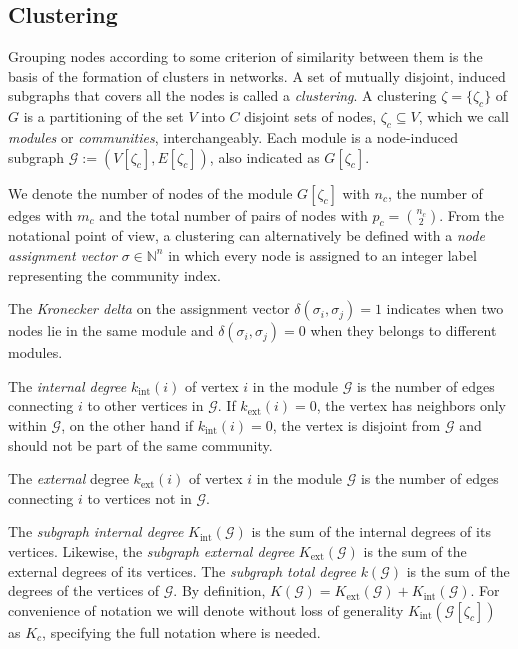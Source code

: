 \subsection{Clustering}\label{sec:clustering}
Grouping nodes according to some criterion of similarity between them is the basis of the formation of clusters in networks.
A set of mutually disjoint, induced subgraphs that covers all the nodes is called a \emph{clustering}.
A clustering $\zeta = \{\zeta_c\}$ of $G$ is a partitioning of the set $V$ into $C$ disjoint sets of nodes, $\zeta_c \subseteq V$, which we call \emph{modules} or \emph{communities}, interchangeably. 
Each module is a node-induced subgraph $\mathcal{G}:=(V[\zeta_c],E[\zeta_c])$, also indicated as $G[\zeta_c]$.

We denote the number of nodes of the module $G[\zeta_c]$ with $n_c$, the number of edges with $m_c$ and the total number of pairs of nodes with $p_c=\binom{n_c}{2}$.
From the notational point of view, a clustering can alternatively be defined with a \emph{node assignment vector} $\sigma \in \mathbb{N}^n$ in which every node is assigned to an integer label representing the community index. 

The \emph{Kronecker delta} on the assignment vector $\delta(\sigma_i,\sigma_j)=1$ indicates when two nodes lie in the same module and $\delta(\sigma_i,\sigma_j)=0$ when they belongs to different modules.

The \emph{internal degree} $k_{\textrm{int}}(i)$ of vertex $i$ in the module $\mathcal{G}$ is the number of edges connecting $i$ to other vertices in $\mathcal{G}$. If $k_{\textrm{ext}}(i)=0$, the vertex has neighbors only within $\mathcal{G}$, on the other hand if $k_{\textrm{int}}(i)=0$, the vertex is disjoint from $\mathcal{G}$ and should not be part of the same community.

The \emph{external} degree $k_{\textrm{ext}}(i)$ of vertex $i$ in the module $\mathcal{G}$ is the number of edges connecting $i$ to vertices not in $\mathcal{G}$.

The \emph{subgraph internal degree} $K_{\textrm{int}}(\mathcal{G})$ is the sum of the internal degrees of its vertices.
Likewise, the \emph{subgraph external degree} $K_{\textrm{ext}}(\mathcal{G})$ is the sum of the external degrees of its vertices.
The \emph{subgraph total degree} $k(\mathcal{G})$ is the sum of the degrees of the vertices of $\mathcal{G}$. By definition, $K(\mathcal{G}) = K_{\textrm{ext}}(\mathcal{G}) + K_{\textrm{int}}(\mathcal{G})$. For convenience of notation we will denote without loss of generality $K_{\textrm{int}}(\mathcal{G}[ \zeta_c ])$ as $K_c$, specifying the full notation where is needed.

